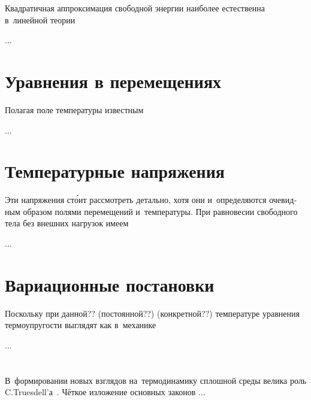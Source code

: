 \begin{otherlanguage}{russian}

Квадратичная аппроксимация свободной энергии наиболее естественна в~линейной теории

...



\section{Уравнения в перемещениях}

Полагая поле температуры известным

...



\section{Температурные напряжения}

Эти напряжения ст\'{о}ит рассмотреть детально, хотя они и~определяются очевидным образом полями перемещений и~температуры. При равновесии свободного тела без внешних нагрузок имеем

...



\section{Вариационные постановки}

Поскольку при данной?? (постоянной??) (конкретной??) температуре уравнения термоупругости выглядят как в~механике

...




\vspace{8mm}
\hfill\begin{minipage}[b]{0.95\linewidth}
\fontsize{10}{12}\selectfont

\section*{\wordforbibliography}

В~формировании новых взглядов на~термодинамику сплошной среды велика роль C.\:Truesdell’а~\cite{truesdell-firstcourse}. Чёткое изложение основных законов ...

\end{minipage}

\end{otherlanguage}
